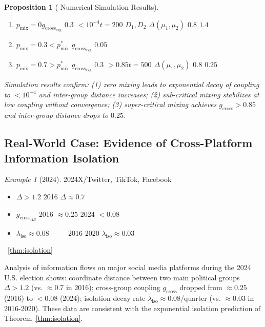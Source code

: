 \documentclass[11pt,a4paper]{article}
\newtheorem{proposition}[theorem]{Proposition}
\theoremstyle{remark}
\newtheorem{example}[theorem]{Example}
\newcommand{\ISOLambda}{\lambda_{\text{iso}}}
\newcommand{\GCoupling}{g_{\text{cross}}}
\begin{document}
\begin{proposition}[ Numerical Simulation Results]
\label{prop:numerical}

\begin{enumerate}[label=(\arabic*)]
\item \textbf{}$p_{\text{mix}} = 0$$\GCoupling_{\text{avg}}$  $0.3$  $<10^{-4}$$t=200$
 $D_1, D_2$  $\Delta(\mu_1, \mu_2)$  $0.8$  $1.4$
\item \textbf{}$p_{\text{mix}} = 0.3 < p_{\text{mix}}^*$
$\GCoupling_{\text{avg}}$  $0.05$
\item \textbf{}$p_{\text{mix}} = 0.7 > p_{\text{mix}}^*$
$\GCoupling_{\text{avg}}$  $0.3$  $>0.85$$t=500$
 $\Delta(\mu_1, \mu_2)$  $0.8$  $0.25$
\end{enumerate}

Simulation results confirm: (1) zero mixing leads to exponential decay of coupling to
$<10^{-4}$ and inter-group distance increases; (2) sub-critical mixing stabilizes at
low coupling without convergence; (3) super-critical mixing achieves $\GCoupling > 0.85$
and inter-group distance drops to $0.25$.
\end{proposition}

\subsection{}

\subsection{Real-World Case: Evidence of Cross-Platform Information Isolation}

\begin{example}[2024]
2024X/Twitter, TikTok, Facebook
\begin{itemize}
\item  $\Delta > 1.2$
2016 $\Delta \approx 0.7$
\item  $\GCoupling_{AB}$ 2016 $\approx 0.25$ 2024 $<0.08$
\item  $\ISOLambda \approx 0.08$ ——
2016-2020 $\ISOLambda \approx 0.03$ 
\end{itemize}
~\ref{thm:isolation} 

Analysis of information flows on major social media platforms during the 2024 U.S.
election shows: coordinate distance between two main political groups $\Delta > 1.2$
(vs. $\approx 0.7$ in 2016); cross-group coupling $\GCoupling$ dropped from $\approx 0.25$
(2016) to $<0.08$ (2024); isolation decay rate $\ISOLambda \approx 0.08$/quarter
(vs. $\approx 0.03$ in 2016-2020). These data are consistent with the exponential
isolation prediction of Theorem~\ref{thm:isolation}.
\end{example}
\end{document}
